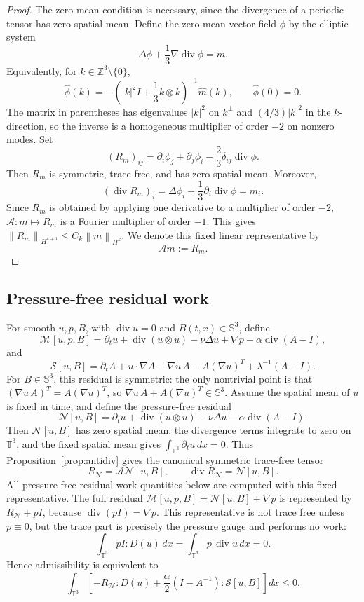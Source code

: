 \documentclass[10pt,a4paper]{amsart}
\numberwithin{equation}{section}
\newcommand{\T}{\mathbb T}
\newcommand{\Id}{I}
\newcommand{\Sym}{\mathbb S}
\newcommand{\divv}{\operatorname{div}}
\newcommand{\calM}{\mathcal M}
\newcommand{\calN}{\mathcal N}
\newcommand{\calS}{\mathcal S}
\newcommand{\calA}{\mathcal A}
\newcommand{\norm}[1]{\left\lVert #1\right\rVert}
\begin{document}
\begin{proof}
The zero-mean condition is necessary, since the divergence of a periodic
tensor has zero spatial mean.  Define the zero-mean vector field \(\phi\) by
the elliptic system
\[
  \Delta\phi+\frac13\nabla\divv\phi=m .
\]
Equivalently, for \(k\in\mathbb Z^3\setminus\{0\}\),
\[
  \widehat\phi(k)
  =
  -\left(|k|^2\Id+\frac13 k\otimes k\right)^{-1}\widehat m(k),
  \qquad
  \widehat\phi(0)=0 .
\]
The matrix in parentheses has eigenvalues \(|k|^2\) on \(k^\perp\) and
\((4/3)|k|^2\) in the \(k\)-direction, so the inverse is a homogeneous
multiplier of order \(-2\) on nonzero modes.  Set
\[
  (R_m)_{ij}
  =
  \partial_i\phi_j+\partial_j\phi_i-\frac23\delta_{ij}\divv\phi .
\]
Then \(R_m\) is symmetric, trace free, and has zero spatial mean.  Moreover,
\[
  (\divv R_m)_i
  =
  \Delta\phi_i+\frac13\partial_i\divv\phi=m_i .
\]
Since \(R_m\) is obtained by applying one derivative to a multiplier of order
\(-2\), \(\calA:m\mapsto R_m\) is a Fourier multiplier of order \(-1\).  This
gives \(\norm{R_m}_{H^{k+1}}\le C_k\norm{m}_{H^k}\).  We denote this fixed
linear representative by
\[
  \calA m:=R_m .
\]
\end{proof}

\subsection{Pressure-free residual work}

For smooth \(u,p,B\), with \(\divv u=0\) and \(B(t,x)\in\Sym^3\), define
\[
  \calM[u,p,B]
  =
  \partial_t u+\divv(u\otimes u)-\nu\Delta u+\nabla p
  -\alpha\divv(A-\Id),
\]
and
\[
  \calS[u,B]
  =
  \partial_t A+u\cdot\nabla A-\nabla u\,A-A(\nabla u)^T+\lambda^{-1}(A-\Id).
\]
For \(B\in\Sym^3\), this residual is symmetric: the only nontrivial point is
that \((\nabla u\,A)^T=A(\nabla u)^T\), so
\(\nabla u\,A+A(\nabla u)^T\in\Sym^3\).
Assume the spatial mean of \(u\) is fixed in time, and define the
pressure-free residual
\[
  \calN[u,B]
  =
  \partial_t u+\divv(u\otimes u)-\nu\Delta u-\alpha\divv(A-\Id).
\]
Then \(\calN[u,B]\) has zero spatial mean: the divergence terms integrate to
zero on \(\T^3\), and the fixed spatial mean gives
\(\int_{\T^3}\partial_t u\,dx=0\).  Thus Proposition~\ref{prop:antidiv}
gives the canonical symmetric trace-free tensor
\[
  R_{\calN}=\calA\calN[u,B],
  \qquad
  \divv R_{\calN}=\calN[u,B].
\]
All pressure-free residual-work quantities below are computed with this fixed
representative.  The full residual
\(\calM[u,p,B]=\calN[u,B]+\nabla p\) is represented by
\(R_{\calN}+p\Id\), because \(\divv(p\Id)=\nabla p\).  This representative is
not trace free unless \(p\equiv0\), but the trace part is precisely the
pressure gauge and performs no work:
\[
  \int_{\T^3}p\Id:D(u)\,dx
  =
  \int_{\T^3}p\,\divv u\,dx=0 .
\]
Hence admissibility is equivalent to
\begin{equation}
  \int_{\T^3}
  \left[
  -R_{\calN}:D(u)
  +\frac{\alpha}{2}(\Id-A^{-1}):\calS[u,B]
  \right]dx
  \le0 .
  \label{eq:pressure-free}
\end{equation}
\end{document}
